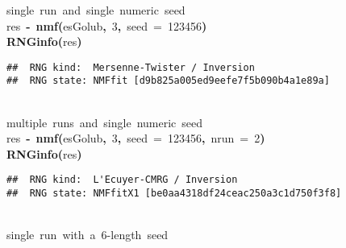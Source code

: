 \documentclass[a4paper]{article}\usepackage{graphicx, color}
\makeatletter
\newcommand{\hlnumber}[1]{\textcolor[rgb]{0,0,0}{#1}}%
\newcommand{\hlfunctioncall}[1]{\textcolor[rgb]{0.501960784313725,0,0.329411764705882}{\textbf{#1}}}%
\newcommand{\hlkeyword}[1]{\textcolor[rgb]{0,0,0}{\textbf{#1}}}%
\newcommand{\hlargument}[1]{\textcolor[rgb]{0.690196078431373,0.250980392156863,0.0196078431372549}{#1}}%
\newcommand{\hlcomment}[1]{\textcolor[rgb]{0.180392156862745,0.6,0.341176470588235}{#1}}%
\newcommand{\hlassignement}[1]{\textcolor[rgb]{0,0,0}{\textbf{#1}}}%
\newcommand{\hlsymbol}[1]{\textcolor[rgb]{0,0,0}{#1}}%
\newcommand{\hlstd}[1]{\textcolor[rgb]{0,0,0}{#1}}%
\newenvironment{kframe}{%
 \def\FrameCommand##1{\hskip\@totalleftmargin \hskip-\fboxsep
 \colorbox{shadecolor}{##1}\hskip-\fboxsep
     \hskip-\linewidth \hskip-\@totalleftmargin \hskip\columnwidth}%
 \MakeFramed {\advance\hsize-\width
   \@totalleftmargin\z@ \linewidth\hsize
   \@setminipage}}%
 {\par\unskip\endMakeFramed}
\newenvironment{knitrout}{}{} %
\makeatother
\begin{document}
\begin{knitrout}
\color{fgcolor}\begin{kframe}
\begin{flushleft}
\ttfamily\noindent
\hlcomment{\usebox{\hlnormalsizeboxhash}{\ }single{\ }run{\ }and{\ }single{\ }numeric{\ }seed}\hspace*{\fill}\\
\hlstd{}\hlsymbol{res}{\ }\hlassignement{\usebox{\hlnormalsizeboxlessthan}-}{\ }\hlfunctioncall{nmf}\hlkeyword{(}\hlsymbol{esGolub}\hlkeyword{,}{\ }\hlnumber{3}\hlkeyword{,}{\ }\hlargument{seed}{\ }\hlargument{=}{\ }\hlnumber{123456}\hlkeyword{)}\hspace*{\fill}\\
\hlstd{}\hlfunctioncall{RNGinfo}\hlkeyword{(}\hlsymbol{res}\hlkeyword{)}\mbox{}
\normalfont
\end{flushleft}
\begin{verbatim}
##  RNG kind:  Mersenne-Twister / Inversion 
##  RNG state: NMFfit [d9b825a005ed9eefe7f5b090b4a1e89a] 
\end{verbatim}
\begin{flushleft}
\ttfamily\noindent
\hspace*{\fill}\\
\hlstd{}\hlcomment{\usebox{\hlnormalsizeboxhash}{\ }multiple{\ }runs{\ }and{\ }single{\ }numeric{\ }seed}\hspace*{\fill}\\
\hlstd{}\hlsymbol{res}{\ }\hlassignement{\usebox{\hlnormalsizeboxlessthan}-}{\ }\hlfunctioncall{nmf}\hlkeyword{(}\hlsymbol{esGolub}\hlkeyword{,}{\ }\hlnumber{3}\hlkeyword{,}{\ }\hlargument{seed}{\ }\hlargument{=}{\ }\hlnumber{123456}\hlkeyword{,}{\ }\hlargument{nrun}{\ }\hlargument{=}{\ }\hlnumber{2}\hlkeyword{)}\hspace*{\fill}\\
\hlstd{}\hlfunctioncall{RNGinfo}\hlkeyword{(}\hlsymbol{res}\hlkeyword{)}\mbox{}
\normalfont
\end{flushleft}
\begin{verbatim}
##  RNG kind:  L'Ecuyer-CMRG / Inversion 
##  RNG state: NMFfitX1 [be0aa4318df24ceac250a3c1d750f3f8] 
\end{verbatim}
\begin{flushleft}
\ttfamily\noindent
\hspace*{\fill}\\
\hlstd{}\hlcomment{\usebox{\hlnormalsizeboxhash}{\ }single{\ }run{\ }with{\ }a{\ }6-length{\ }seed}\hspace*{\fill}\\

\end{flushleft}
\end{kframe}
\end{knitrout}
\end{document}
